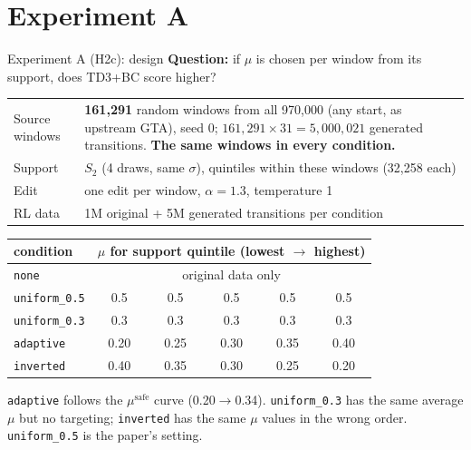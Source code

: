 \documentclass[aspectratio=169,11pt]{beamer}
\begin{document}
\section{Experiment A}
\begin{frame}{Experiment A (H2c): design}
\small
\textbf{Question:} if $\mu$ is chosen per window from its support, does TD3+BC score higher?
\vspace{0.3em}

\begin{tabularx}{\linewidth}{lY}
\toprule
Source windows & \textbf{161{,}291} random windows from all 970{,}000 (any start, as upstream GTA), seed 0; $161{,}291\times31=5{,}000{,}021$ generated transitions. \textbf{The same windows in every condition.}\\
Support & $S_2$ (4 draws, same $\sigma$), quintiles within these windows (32{,}258 each)\\
Edit & one edit per window, $\alpha=1.3$, temperature 1\\
RL data & 1M original + 5M generated transitions per condition\\
\bottomrule
\end{tabularx}
\vspace{0.4em}

\centering
\begin{tabular}{lccccc}
\toprule
condition & \multicolumn{5}{c}{$\mu$ for support quintile (lowest $\to$ highest)}\\
\midrule
\texttt{none} & \multicolumn{5}{c}{original data only}\\
\texttt{uniform\_0.5} & 0.5 & 0.5 & 0.5 & 0.5 & 0.5\\
\texttt{uniform\_0.3} & 0.3 & 0.3 & 0.3 & 0.3 & 0.3\\
\texttt{adaptive} & 0.20 & 0.25 & 0.30 & 0.35 & 0.40\\
\texttt{inverted} & 0.40 & 0.35 & 0.30 & 0.25 & 0.20\\
\bottomrule
\end{tabular}

\raggedright\scriptsize \texttt{adaptive} follows the $\mu^{\text{safe}}$ curve (0.20$\to$0.34). \texttt{uniform\_0.3} has the same average $\mu$ but no targeting; \texttt{inverted} has the same $\mu$ values in the wrong order. \texttt{uniform\_0.5} is the paper's setting.
\end{frame}
\end{document}

